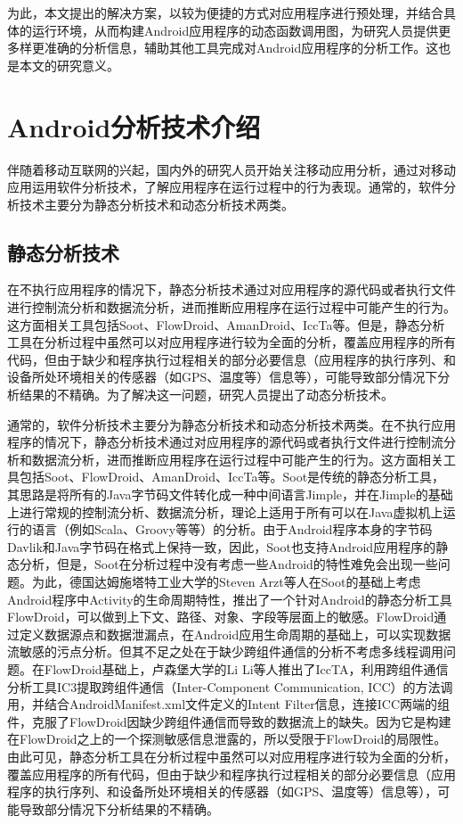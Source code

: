 为此，本文提出的解决方案，以较为便捷的方式对应用程序进行预处理，并结合具体的运行环境，从而构建Android应用程序的动态函数调用图，为研究人员提供更多样更准确的分析信息，辅助其他工具完成对Android应用程序的分析工作。这也是本文的研究意义。
\section{Android分析技术介绍}

伴随着移动互联网的兴起，国内外的研究人员开始关注移动应用分析，通过对移动应用运用软件分析技术，了解应用程序在运行过程中的行为表现。通常的，软件分析技术主要分为静态分析技术和动态分析技术两类。

\subsection{静态分析技术}
在不执行应用程序的情况下，静态分析技术通过对应用程序的源代码或者执行文件进行控制流分析和数据流分析，进而推断应用程序在运行过程中可能产生的行为。这方面相关工具包括Soot、FlowDroid、AmanDroid、IccTa等。但是，静态分析工具在分析过程中虽然可以对应用程序进行较为全面的分析，覆盖应用程序的所有代码，但由于缺少和程序执行过程相关的部分必要信息（应用程序的执行序列、和设备所处环境相关的传感器（如GPS、温度等）信息等），可能导致部分情况下分析结果的不精确。为了解决这一问题，研究人员提出了动态分析技术。

通常的，软件分析技术主要分为静态分析技术和动态分析技术两类。在不执行应用程序的情况下，静态分析技术通过对应用程序的源代码或者执行文件进行控制流分析和数据流分析，进而推断应用程序在运行过程中可能产生的行为。这方面相关工具包括Soot、FlowDroid、AmanDroid、IccTa等。Soot是传统的静态分析工具，其思路是将所有的Java字节码文件转化成一种中间语言Jimple，并在Jimple的基础上进行常规的控制流分析、数据流分析，理论上适用于所有可以在Java虚拟机上运行的语言（例如Scala、Groovy等等）的分析。由于Android程序本身的字节码Davlik和Java字节码在格式上保持一致，因此，Soot也支持Android应用程序的静态分析，但是，Soot在分析过程中没有考虑一些Android的特性难免会出现一些问题。为此，德国达姆施塔特工业大学的Steven Arzt等人在Soot的基础上考虑Android程序中Activity的生命周期特性，推出了一个针对Android的静态分析工具FlowDroid，可以做到上下文、路径、对象、字段等层面上的敏感。FlowDroid通过定义数据源点和数据泄漏点，在Android应用生命周期的基础上，可以实现数据流敏感的污点分析。但其不足之处在于缺少跨组件通信的分析不考虑多线程调用问题。在FlowDroid基础上，卢森堡大学的Li Li等人推出了IccTA，利用跨组件通信分析工具IC3提取跨组件通信（Inter-Component Communication, ICC）的方法调用，并结合AndroidManifest.xml文件定义的Intent Filter信息，连接ICC两端的组件，克服了FlowDroid因缺少跨组件通信而导致的数据流上的缺失。因为它是构建在FlowDroid之上的一个探测敏感信息泄露的，所以受限于FlowDroid的局限性。由此可见，静态分析工具在分析过程中虽然可以对应用程序进行较为全面的分析，覆盖应用程序的所有代码，但由于缺少和程序执行过程相关的部分必要信息（应用程序的执行序列、和设备所处环境相关的传感器（如GPS、温度等）信息等），可能导致部分情况下分析结果的不精确。


